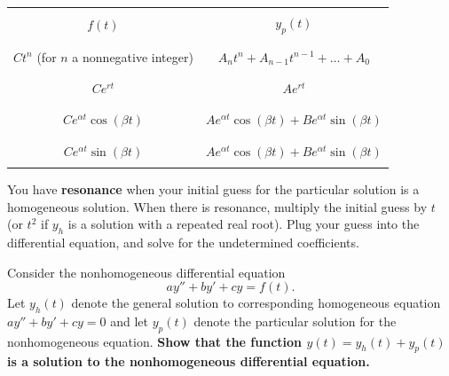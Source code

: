 \begin{center}
\begin{tabular}{|c|c|}
\hline
 & \\
$f(t)$ & $y_p(t)$ \\
 & \\
\hline 
\hline
 & \\
$Ct^n$  (for $n$ a nonnegative integer) &  $A_nt^n + A_{n-1}t^{n-1}+\ldots + A_0 $  \\
 & \\
\hline
 & \\
 $Ce^{rt}$ &  $Ae^{rt}$ \\

 & \\
\hline
 & \\
$Ce^{\alpha t} \cos{(\beta t)}$ &  $A e^{\alpha t}\cos{(\beta t)} + B e^{\alpha t}\sin{(\beta t)}$\\
& \\
\hline
 & \\
 $Ce^{\alpha t} \sin{(\beta t)}$ &  $Ae^{\alpha t} \cos{(\beta t)} + B e^{\alpha t}\sin{(\beta t)}$\\
 & \\
\hline
\end{tabular}
\end{center}
\bi
\ii You have \textbf{resonance} when your initial guess for the particular solution is a homogeneous solution.
\ii When there is resonance, multiply the initial guess by $t$ (or $t^2$ if $y_h$ is a solution with a repeated real root).
\ei
\ii Plug your guess into the differential equation, and solve for the undetermined coefficients.
\ee

\clearpage
{}
\bb
\ii Consider the nonhomogeneous differential equation
\[ a y''+by'+cy=f(t).\]
Let $y_h(t)$ denote the general solution to corresponding homogeneous equation $a y''+by'+cy=0$ and let $y_p(t)$ denote the particular solution for the nonhomogeneous equation. \textbf{Show that the function $y(t)=y_h(t)+y_p(t)$ is a solution to the nonhomogeneous differential equation.} \vfill

